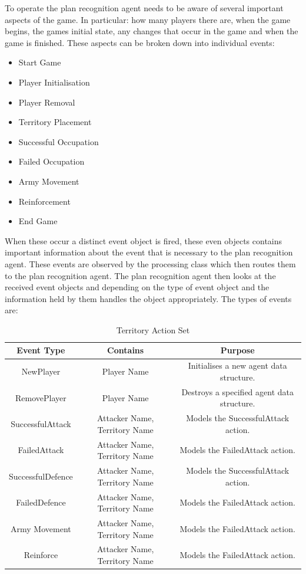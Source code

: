 \documentclass[parskip]{cs4rep}
\begin{document}
To operate the plan recognition agent needs to be aware of several important aspects of the game. In particular: how many players there are, when the game begins, the games initial state, any changes that occur in the game and when the game is finished. These aspects can be broken down into individual events:

\begin{itemize}
\item
Start Game
\item
Player Initialisation
\item
Player Removal
\item
Territory Placement
\item
Successful Occupation
\item
Failed Occupation
\item
Army Movement
\item
Reinforcement
\item
End Game
\end{itemize}

When these occur a distinct event object is fired, these even objects contains important information about the event that is necessary to the plan recognition agent. These events are observed by the processing class which then routes them to the plan recognition agent. The plan recognition agent then looks at the received event objects and depending on the type of event object and the information held by them handles the object appropriately. The types of events are:

\begin{table}[ht]
\centering
\begin{tabular}{|c|c|c|}
\hline 
\textbf{Event Type} & \textbf{Contains} & \textbf{Purpose} \\ 
\hline 
NewPlayer & Player Name & Initialises a new agent data structure. \\ 
\hline 
RemovePlayer & Player Name & Destroys a specified agent data structure. \\ 
\hline 
SuccessfulAttack & Attacker Name, Territory Name & Models the SuccessfulAttack action. \\ 
\hline
FailedAttack & Attacker Name, Territory Name & Models the FailedAttack action. \\ 
\hline
SuccessfulDefence & Attacker Name, Territory Name & Models the SuccessfulAttack action. \\ 
\hline
FailedDefence & Attacker Name, Territory Name & Models the FailedAttack action. \\ 
\hline
Army Movement & Attacker Name, Territory Name & Models the FailedAttack action. \\ 
\hline
Reinforce & Attacker Name, Territory Name & Models the FailedAttack action. \\ 
\hline
\end{tabular}
\caption{Territory Action Set}
\label{table:event-description}
\end{table}
\end{document}
